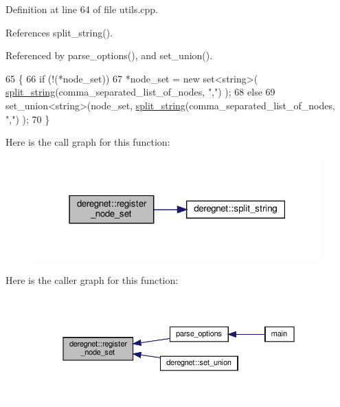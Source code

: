 Definition at line 64 of file utils.\+cpp.



References split\+\_\+string().



Referenced by parse\+\_\+options(), and set\+\_\+union().


\begin{DoxyCode}
65                                                              \{
66     \textcolor{keywordflow}{if} (!(*node\_set))
67         *node\_set = \textcolor{keyword}{new} set<string>( \hyperlink{namespacederegnet_aa12afb18c8703a823fee68c5b9a04bca}{split\_string}(comma\_separated\_list\_of\_nodes, \textcolor{stringliteral}{","}) );
68     \textcolor{keywordflow}{else}
69         set\_union<string>(node\_set, \hyperlink{namespacederegnet_aa12afb18c8703a823fee68c5b9a04bca}{split\_string}(comma\_separated\_list\_of\_nodes, \textcolor{stringliteral}{","}) );
70 \}
\end{DoxyCode}
Here is the call graph for this function\+:\nopagebreak
\begin{figure}[H]
\begin{center}
\leavevmode
\includegraphics[width=315pt]{namespacederegnet_a639799db7e485ee8cc15b5933be7b4ba_cgraph}
\end{center}
\end{figure}
Here is the caller graph for this function\+:\nopagebreak
\begin{figure}[H]
\begin{center}
\leavevmode
\includegraphics[width=350pt]{namespacederegnet_a639799db7e485ee8cc15b5933be7b4ba_icgraph}
\end{center}
\end{figure}
\mbox{\label{namespacederegnet_a3ca4926831aa9ca021d1b9230429e8bd}} 
